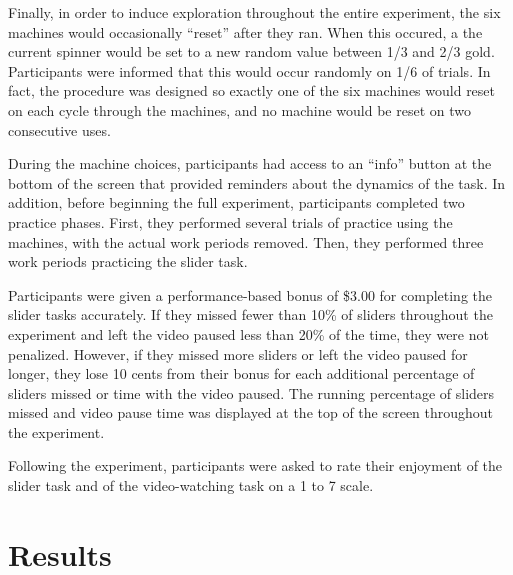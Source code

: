 \documentclass[10pt,letterpaper]{article}
\begin{document}
Finally, in order to induce exploration throughout the entire experiment, the
six machines would occasionally ``reset'' after they ran. When this occured, a
the current spinner would be set to a new random value between 1/3 and 2/3 gold.
Participants were informed that this would occur randomly on
1/6 of trials. In fact, the procedure was designed so exactly one of the six
machines would reset on each cycle through the machines, and no machine would be
reset on two consecutive uses.

During the machine choices, participants had access to an ``info'' button at the
bottom of the screen that provided reminders about the dynamics of the task. In
addition, before beginning the full experiment, participants completed two
practice phases. First, they performed several trials of practice using the
machines, with the actual work periods removed. Then, they performed three work
periods practicing the slider task.

Participants were given a performance-based bonus of \$3.00 for completing the
slider tasks accurately. If they missed fewer than 10\% of sliders throughout
the experiment and left the video paused less than 20\% of the time, they were
not penalized. However, if they missed more sliders or left the video paused for
longer, they lose 10 cents from their bonus for each additional percentage of
sliders missed or time with the video paused. The running percentage of sliders
missed and video pause time was displayed at the top of the screen throughout
the experiment.

Following the experiment, participants were asked to rate their enjoyment of the
slider task and of the video-watching task on a 1 to 7 scale.


\section{Results}
\end{document}
